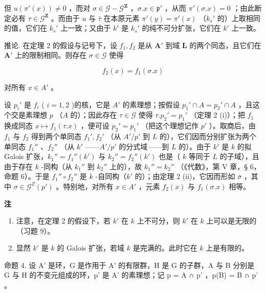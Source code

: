  但 \(u(\pi'(x)) \neq 0\) ，而对 \(\sigma \in \mathcal{G} - \mathcal{G}^{\mathbf{Z}}\) ，\(\sigma.x \in \mathfrak{p}'\) ，从而 \(\pi'(\sigma.x) = 0\) ；由此断定必有 \(\tau \in \mathcal{G}^{\mathbf{Z}}\) 。而由于 \(u\) 与 \(\bar{\tau}\) 在本原元素 \(\pi'(y) = \pi'(x)\) （\(k_s'\) 的）上取相同的值，它们在 \(k_s'\) 上一致；又由于 \(k'\) 是 \(k_s'\) 的纯不可分扩张，它们在 \(k'\) 上一致。

推论. 在定理 2 的假设与记号下，设 \(f_1, f_2\) 是从 \(\mathbf{A}'\) 到域 \(\mathbf{L}\) 的两个同态，且它们在 \(\mathbf{A}'\) 上的限制相同。则存在 \(\sigma \in \mathcal{G}\) 使得

\[
f _ {2} (x) = f _ {1} (\sigma . x)
\]

对所有 \(x \in A'\) 。

设 \(p_{i}'\) 是 \(f_{i}\) ( \(i = 1, 2\) )的核，它是 \(A'\) 的素理想；按假设 \(p_{1}' \cap A = p_{2}' \cap A\) ，且这个交是素理想 \(p\) （\(A\) 的）；因此存在 \(\tau \in \mathcal{G}\) 使得 \(\tau. p_{2}' = p_{1}'\) （定理 2 (i)）；把 \(f_{1}\) 换成同态 \(x \mapsto f_{1}(\tau.x)\) ，便可设 \(p_{2}' = p_{1}'\) （把这个理想记作 \(p'\) ）。取商后，由 \(f_{1}\) 与 \(f_{2}\) 得到两个单同态 \(f_{1}', f_{2}'\) （从 \(A'/p'\) 到 \(L\) 的），它们因而分别扩张为两个单同态 \(f_{1}''\) 、\(f_{2}''\) （从 \(k'\) ——\(A'/p'\) 的分式域——到 \(L\) 的）。由于 \(k'\) 是 \(k\) 的拟 Galois 扩张，\(k_{1}'' = f_{1}''(k')\) 与 \(k_{2}'' = f_{2}''(k')\) 也是（ \(k\) 等同于 \(L\) 的子域），且由于存在 \(k\) -同构（从 \(k_{1}''\) 到 \(k_{2}''\) 上的），故 \(k_{1}'' = k_{2}''\) （《代数》，第 V 章，§ 6，命题 6）。于是 \(f_{1}'' \circ f_{2}''\) 是 \(k\) -自同构（\(k'\) 的）；由定理 2 (ii)，它因而形如 \(\bar{\sigma}\) ，其中 \(\sigma \in \mathcal{G}^{Z}(p')\) 。特别地，对所有 \(x \in A'\) ，元素 \(f_{2}(x)\) 与 \(f_{1}(\sigma.x)\) 相等。

\textbf{注}\par

\begin{enumerate}
\def\labelenumi{(\arabic{enumi})}
\item
  注意，在定理 2 的假设下，若 \(k'\) 在 \(k\) 上不可分，则 \(k'\) 在 \(k\) 上可以是无限的（习题 9）。
\item
  显然 \(k'\) 是 \(k\) 的 Galois 扩张，若域 \(k\) 是完满的。此时它在 \(k\) 上是有限的。
\end{enumerate}

命题 4. 设 A' 是环，G 是作用于 A' 的有限群，H 是 G 的子群，A 与 B 分别是 G 与 H 的不变元组成的环，p' 是 A' 的素理想；记 p = A ∩ p' ，p(B) = B ∩ p' 。

